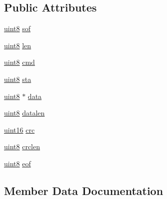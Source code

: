 \subsection*{Public Attributes}
\begin{DoxyCompactItemize}
\item 
\mbox{\hyperlink{m900dll_8h_adde6aaee8457bee49c2a92621fe22b79}{uint8}} \mbox{\hyperlink{struct_u_h_f915_m___rsp_frame__t_a5c935d184864895243f2a6db211db4dd}{sof}}
\item 
\mbox{\hyperlink{m900dll_8h_adde6aaee8457bee49c2a92621fe22b79}{uint8}} \mbox{\hyperlink{struct_u_h_f915_m___rsp_frame__t_a411750f337526e9612dfa90e5c2ca68d}{len}}
\item 
\mbox{\hyperlink{m900dll_8h_adde6aaee8457bee49c2a92621fe22b79}{uint8}} \mbox{\hyperlink{struct_u_h_f915_m___rsp_frame__t_a2f282a7729269542c1394fc43b4bbf28}{cmd}}
\item 
\mbox{\hyperlink{m900dll_8h_adde6aaee8457bee49c2a92621fe22b79}{uint8}} \mbox{\hyperlink{struct_u_h_f915_m___rsp_frame__t_a30fc47f32858619f9953918a2680140c}{sta}}
\item 
\mbox{\hyperlink{m900dll_8h_adde6aaee8457bee49c2a92621fe22b79}{uint8}} $\ast$ \mbox{\hyperlink{struct_u_h_f915_m___rsp_frame__t_a2c6275b9c2033a6b010bac9968f165eb}{data}}
\item 
\mbox{\hyperlink{m900dll_8h_adde6aaee8457bee49c2a92621fe22b79}{uint8}} \mbox{\hyperlink{struct_u_h_f915_m___rsp_frame__t_ad38134c64b17a976b147397245874dff}{datalen}}
\item 
\mbox{\hyperlink{m900dll_8h_a05f6b0ae8f6a6e135b0e290c25fe0e4e}{uint16}} \mbox{\hyperlink{struct_u_h_f915_m___rsp_frame__t_aa8d0d0f454717901230fcfdc781e41f7}{crc}}
\item 
\mbox{\hyperlink{m900dll_8h_adde6aaee8457bee49c2a92621fe22b79}{uint8}} \mbox{\hyperlink{struct_u_h_f915_m___rsp_frame__t_a5513cb882043e93961ad22c0c5054789}{crclen}}
\item 
\mbox{\hyperlink{m900dll_8h_adde6aaee8457bee49c2a92621fe22b79}{uint8}} \mbox{\hyperlink{struct_u_h_f915_m___rsp_frame__t_aedbb3243f88f1695bc558a12f7fa024b}{eof}}
\end{DoxyCompactItemize}


\subsection{Member Data Documentation}
\mbox{\label{struct_u_h_f915_m___rsp_frame__t_a2f282a7729269542c1394fc43b4bbf28}} 
